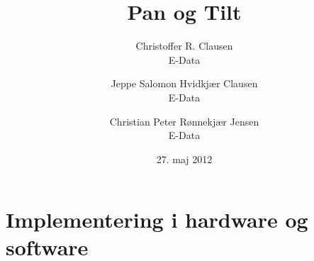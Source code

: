 \documentclass[a4paper,12pt,twoside]{report}
\title{Pan og Tilt}
\author{		
		Christoffer R. Clausen\\E-Data\and
		Jeppe Salomon Hvidkjær Clausen\\E-Data\and
		Christian Peter Rønnekjær Jensen\\E-Data}
\date{27. maj 2012}
\begin{document}


\clearpage\thispagestyle{empty}\mbox{}\clearpage %
\thispagestyle{empty}





\clearpage\thispagestyle{empty}\mbox{}\clearpage %
\clearpage\thispagestyle{empty}\mbox{}\clearpage %







\newpage

\chapter{Implementering i hardware og software}

\newpage



\newpage

\appendix
\addappheadtotoc




\end{document}
